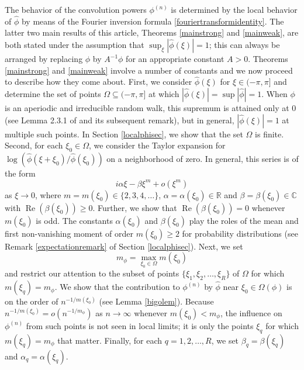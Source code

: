 \documentclass{article}
\theoremstyle{theorem}
\theoremstyle{remark}
\renewcommand\Re{\operatorname{Re}}%
\begin{document}
\noindent The behavior of the convolution powers $\phi^{(n)}$ is determined by the local behavior of $\hat\phi$ by means of the Fourier inversion formula \eqref{fouriertransformidentity}. The latter two main results of this article, Theorems \ref{mainstrong} and \ref{mainweak}, are both stated under the assumption that $\sup_\xi|\hat\phi(\xi)|=1$; this can always be arranged by replacing $\phi$ by $A^{-1}\phi$ for an appropriate constant $A>0$. Theorems \ref{mainstrong} and \ref{mainweak} involve a number of constants and we now proceed to describe how they come about. First, we consider $\hat{\phi}(\xi)$ for $\xi\in(-\pi,\pi]$ and determine the set of points $\Omega\subseteq (-\pi,\pi]$ at which $|\hat\phi(\xi)|=\sup|\hat\phi|=1$. When $\phi$ is an aperiodic and irreducible random walk, this supremum is attained only at $0$ (see Lemma 2.3.1 of \cite{LL} and its subsequent remark), but in general, $|\hat\phi(\xi)|=1$ at multiple such points. In Section \ref{localphisec}, we show that the set $\Omega$ is 
finite. 
Second, for each $\xi_0\in\Omega$, we consider the Taylor expansion for $\log(\hat\phi(\xi+\xi_0)/\hat\phi(\xi_0))$ on a neighborhood of zero. In general, this series is of the form
\begin{equation*}
i\alpha\xi-\beta\xi^{m}+ o(\xi^{m})
\end{equation*}
as $\xi\rightarrow 0$, where $m=m(\xi_0)\in\{2,3,4,\dots\}$, $\alpha=\alpha(\xi_0)\in\mathbb{R}$ and $\beta=\beta(\xi_0)\in\mathbb{C}$ with $\Re(\beta(\xi_0))\geq 0$. Further, we show that $\Re(\beta(\xi_0))=0$ whenever $m(\xi_0)$ is odd. The constants $\alpha(\xi_0)$ and $\beta(\xi_0)$ play the roles of the mean and first non-vanishing moment of order $m(\xi_0)\geq 2$ for probability distributions (see Remark \ref{expectationremark} of Section \ref{localphisec}). Next, we set 
\begin{equation}\label{defofmphi}
m_\phi=\max_{\xi_0\in\Omega} m(\xi_0)
\end{equation}
and restrict our attention to the subset of points $\{\xi_1,\xi_2,\dots,\xi_R\}$ of $\Omega$ for which $m(\xi_q)=m_\phi$.  We show that the contribution to $\phi^{(n)}$ by $\hat\phi$ near $\xi_0\in\Omega(\phi)$ is on the order of $n^{-1/{m(\xi_0)}}$ (see Lemma \ref{bigolem}). Because $n^{-1/{m(\xi_0)}}=o(n^{-1/m_\phi})$ as $n\rightarrow\infty$ whenever $m(\xi_0)<m_\phi$, the influence on $\phi^{(n)}$ from such points is not seen in local limits; it is only the points $\xi_q$ for which $m(\xi_q)=m_\phi$ that matter. Finally, for each $q=1,2,\dots, R$, we set $\beta_q=\beta(\xi_q)$ and $\alpha_q=\alpha(\xi_q)$. \\
\end{document}
